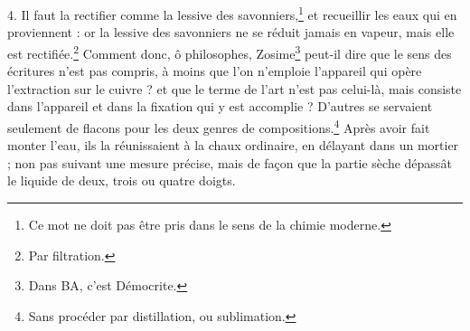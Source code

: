 \documentclass[a4paper, 11pt, oneside, polutonikogreek, french]{article}
\begin{document}
4. Il faut la rectifier comme la lessive des savonniers,\footnote{Ce mot ne doit pas être pris dans le sens de la chimie moderne.} et recueillir les eaux qui en proviennent : or la lessive des savonniers ne se réduit jamais en vapeur, mais elle est rectifiée.\footnote{Par filtration.} Comment donc, ô philosophes, Zosime\footnote{Dans BA, c'est Démocrite.} peut-il dire que le sens des écritures n'est pas compris, à moins que l'on n'emploie l'appareil qui opère l'extraction sur le cuivre ? et que le terme de l'art n'est pas celui-là, mais consiste dans l'appareil et dans la fixation qui y est accomplie ? D'autres se servaient seulement de flacons pour les deux genres de compositions.\footnote{Sans procéder par distillation, ou sublimation.} Après avoir fait monter l'eau, ils la réunissaient à la chaux ordinaire, en délayant dans un mortier ; non pas suivant une mesure précise, mais de façon que la partie sèche dépassât le liquide de deux, trois ou quatre doigts.

\bigskip
\centerline{\EightStarTaper}
\centerline{\EightStarTaper\EightStarTaper}
\bigskip
\end{document}
